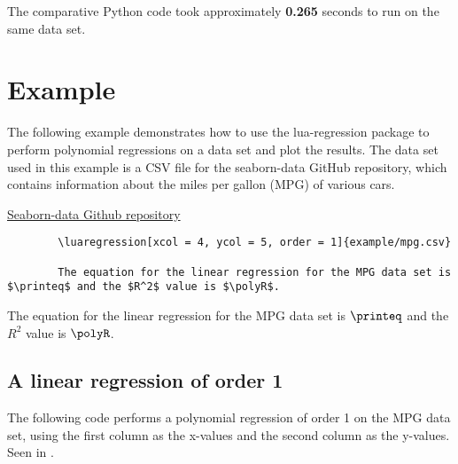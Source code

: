\documentclass[11pt]{article}
\begin{document}
    The comparative Python code took approximately \textbf{0.265} seconds to run on the same data set.

    \pagebreak

    \section{Example}

    The following example demonstrates how to use the {\ttfamily lua-regression} package to perform polynomial regressions on a data set and plot the results.
    The data set used in this example is a CSV file for the seaborn-data GitHub repository, which contains information about the miles per gallon (MPG) of various cars.

    \noindent
    \href{https://github.com/mwaskom/seaborn-data}{Seaborn-data Github repository}

    \begin{verbatim}
        \luaregression[xcol = 4, ycol = 5, order = 1]{example/mpg.csv}

        The equation for the linear regression for the MPG data set is $\printeq$ and the $R^2$ value is $\polyR$.
    \end{verbatim}
	

    \noindent
    The equation for the linear regression for the MPG data set is $\printeq$ and the $R^2$ value is $\polyR$.

    \pagebreak

    \subsection{A linear regression of order 1}

    The following code performs a polynomial regression of order 1 on the MPG data set, using the first column as the x-values and the second column as the y-values.
    Seen in .
\end{document}

